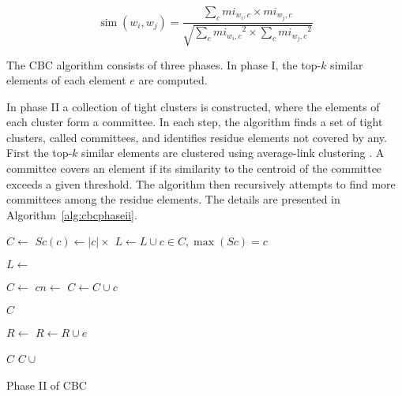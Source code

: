 \begin{equation}
 \operatorname{sim}(w_i,w_j) = \frac{\sum_c mi_{w_i,c} \times mi_{w_j,c}}
                     {\sqrt{\sum_c{mi_{w_i,c}}^2 \times \sum_c{mi_{w_j,c}}^2}}
 \label{eq:simwiwj}
\end{equation}

The \ac{CBC} algorithm consists of three phases. In phase I, the top-$k$
similar elements of each element $e$ are computed.

In phase II a collection of tight clusters is constructed, where the
elements of each cluster form a committee. In each step, the algorithm finds a
set of tight clusters, called committees, and identifies residue elements not
covered by any. First the top-$k$ similar elements are clustered using
average-link clustering \cite{han2000data}. A committee covers an element if
its similarity to the centroid of the committee exceeds a given threshold. The
algorithm then recursively attempts to find more committees among the residue
elements. The details are presented in Algorithm~\ref{alg:cbcphaseii}.

\begin{algorithm}
 \begin{algorithmic}
    \State $C \gets$ 
      \State $Sc(c) \gets |c| \times $ 
    \EndFor
    \State $L \gets L \cup c \in C, \max(Sc) = c$
  \EndFor

  \State $L \gets$ 

  \State $C \gets$ 
    \State $cn \gets$ 
      \State $C \gets C \cup c$
    \EndIf
  \EndFor

    \State \Return $C$
  \EndIf

  \State $R \gets$ 
      \State $R \gets R \cup e$
    \EndIf
  \EndFor

    \State \Return $C$
  \Else
    \State \Return $C \cup$ 
  \EndIf
\EndFunction
 \end{algorithmic}

 \caption{\label{alg:cbcphaseii} Phase II of CBC}
\end{algorithm}


